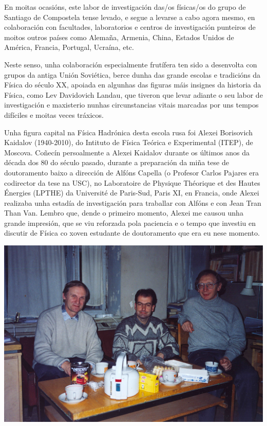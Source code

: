 \begin{refsection}
\begin{multicols}{2}
En moitas ocasións, este labor de investigación das/os físicas/os do grupo de Santiago de Compostela tense levado, e segue a levarse a cabo agora mesmo, en colaboración con facultades, laboratorios e centros de investigación punteiros de moitos outros países como Alemaña, Armenia, China, Estados Unidos de América, Francia, Portugal, Ucraína, etc.

Neste senso, unha colaboración especialmente frutífera ten sido a desenvolta con grupos da antiga Unión Soviética, berce dunha das grande escolas e tradicións da Física do século XX, apoiada en algunhas das figuras máis insignes da historia da Física, como Lev Davidovich Landau, que tiveron que levar adiante o seu labor de investigación e maxisterio nunhas circunstancias vitais marcadas por uns tempos difíciles e moitas veces tráxicos.

Unha figura capital na Física Hadrónica desta escola rusa foi Alexei Borisovich Kaidalov (1940-2010), do Intituto de Física Teórica e Experimental (ITEP), de Moscova. Coñecín persoalmente a Alexei Kaidalov durante os últimos anos da década dos 80 do século pasado, durante a preparación da miña tese de doutoramento baixo a dirección de Alfóns Capella (o Profesor Carlos Pajares era codirector da tese na USC), no Laboratoire de Physique Théorique et des Hautes Énergies (LPTHE) da Université de Paris-Sud, Paris XI, en Francia, onde Alexei realizaba unha estadía de investigación para traballar con Alfóns e con Jean Tran Than Van. Lembro que, dende o primeiro momento, Alexei me causou unha grande impresión, que se viu reforzada pola paciencia e o tempo que investiu en discutir de Física co xoven estudante de doutoramento que era eu nese momento.

\begin{center}
    \includegraphics[width=0.9\linewidth]{revistas/002/imaxes/Kaidalov_Picture.jpg}
\end{center}    


\end{multicols}
\end{refsection}
